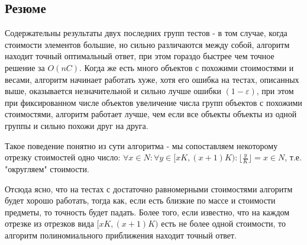 \documentclass{article}
\begin{document}
\subsection{Резюме}

Содержательны результаты двух последних групп тестов - в том случае, когда стоимости элементов большие, но сильно различаются между собой, алгоритм находит точный оптимальный ответ, при этом гораздо быстрее чем точное решение за $O(nC)$. Когда же есть много объектов с похожими стоимостями и весами, алгоритм начинает работать хуже, хотя его ошибка на тестах, описанных выше, оказывается незначительной и сильно лучше ошибки $(1 - \varepsilon)$, при этом при фиксированном числе объектов увеличение числа групп объектов с похожими стоимостями, алгоритм работает лучше, чем если все объекты объекты из одной группы и сильно похожи друг на друга.

Такое поведение понятно из сути алгоритма - мы сопоставляем некоторому отрезку стоимостей одно число:  $\forall x \in N: \forall y \in [x K, (x+1) K) :\lfloor\frac{y}{K}\rfloor = x \in N$, т.е. "округляем" стоимости. 

Отсюда ясно, что на тестах с достаточно равномерными стоимостями алгоритм будет хорошо работать, тогда как, если есть близкие по массе и стоимости предметы, то точность будет падать. Более того, если известно, что на каждом отрезке из отрезков вида $[x K, (x + 1) K)$ есть не более одной стоимости, то алгоритм полиномиального приближения находит точный ответ.
\end{document}
